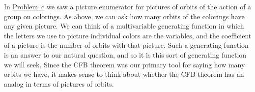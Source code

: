 \documentclass[10pt,]{book}
\theoremstyle{plain}
\theoremstyle{definition}
\theoremstyle{definition}
\numberwithin{equation}{chapter}
\begin{document}
In \hyperref[picture-enumerator-hexagon]{Problem~c} we saw a picture enumerator for pictures of orbits of the action of a group on colorings. As above, we can ask how many orbits of the colorings have any given picture. We can think of a multivariable generating function in which the letters we use to picture individual colors are the variables, and the coefficient of a picture is the number of orbits with that picture. Such a generating function is an answer to our natural question, and so it is this sort of generating function we will seek. Since the CFB theorem was our primary tool for saying how many orbits we have, it makes sense to think about whether the CFB theorem has an analog in terms of pictures of orbits.%
\typeout{************************************************}
\typeout{************************************************}
\end{document}
